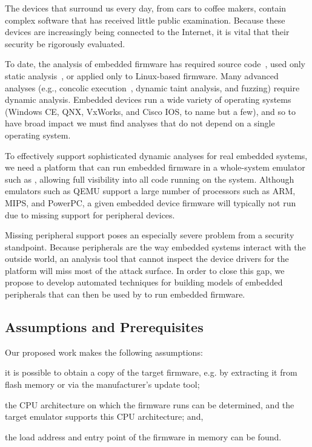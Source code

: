 The devices that surround us every day, from cars to coffee makers,
contain complex software that has received little public examination.
Because these devices are increasingly being connected to the Internet,
it is vital that their security be rigorously evaluated.

To date, the analysis of embedded firmware has required source
code~\cite{davidson:2013:fie}, used only static
analysis~\cite{dreissen:2012:satphone}, or applied only to Linux-based
firmware. Many advanced analyses (e.g., concolic
execution~\cite{godefroid:2005:dart}, dynamic taint analysis, and
fuzzing) require dynamic analysis. Embedded devices run a wide variety
of operating systems (Windows CE, QNX, VxWorks, and Cisco IOS, to name
but a few), and so to have broad impact we must find analyses that do
not depend on a single operating system.

To effectively support sophisticated dynamic analyses for real embedded
systems, we need a platform that can run embedded firmware in a
whole-system emulator such as \dynamicsys, allowing full visibility
into all code running on the system. Although emulators such as QEMU
support a large number of processors such as ARM, MIPS, and PowerPC, a
given embedded device firmware will typically not run due to missing
support for peripheral devices.

Missing peripheral support poses an especially severe problem from a
security standpoint. Because peripherals are the way embedded systems
interact with the outside world, an analysis tool that cannot inspect
the device drivers for the platform will miss most of the attack
surface. In order to close this gap, we propose to develop automated
techniques for building models of embedded peripherals that can then be
used by \dynamicsys to run embedded firmware.

\subsection{Assumptions and Prerequisites}

Our proposed work makes the following assumptions:
\begin{inparaenum}[i)]
    \item it is possible to obtain a copy of the target firmware, e.g.
    by extracting it from flash memory or via the manufacturer's update
    tool;
    \item the CPU architecture on which the firmware runs can be
    determined, and the target emulator supports this CPU architecture;
    and,
    \item the load address and entry point of the firmware in memory can
    be found.
\end{inparaenum}


